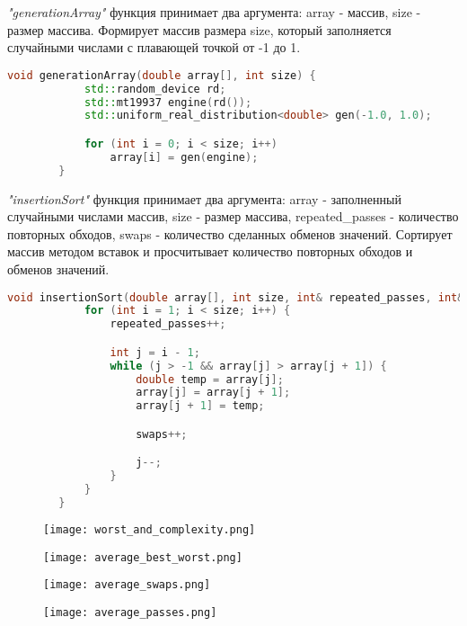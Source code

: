 \documentclass[12pt, a4paper]{report}
\begin{document}
	\textit{"generationArray"} функция принимает два аргумента: array - массив, size - размер массива. Формирует массив размера size, который заполняется случайными числами с плавающей точкой от -1 до 1.
	\lstset{style=mystyle}
	\begin{lstlisting}[language=C++]
		void generationArray(double array[], int size) {
			std::random_device rd;
			std::mt19937 engine(rd());
			std::uniform_real_distribution<double> gen(-1.0, 1.0);

			for (int i = 0; i < size; i++)
				array[i] = gen(engine);
		}		
	\end{lstlisting}

	\textit{"insertionSort"} функция принимает два аргумента: array - заполненный случайными числами массив, size - размер массива, repeated\_passes - количество повторных обходов, swaps - количество сделанных обменов значений. Сортирует массив методом вставок и просчитывает количество повторных обходов и обменов значений.
	\lstset{style=mystyle}
	\begin{lstlisting}[language=C++]
		void insertionSort(double array[], int size, int& repeated_passes, int& swaps) {
			for (int i = 1; i < size; i++) {
				repeated_passes++;

				int j = i - 1;
				while (j > -1 && array[j] > array[j + 1]) {
					double temp = array[j];
					array[j] = array[j + 1];
					array[j + 1] = temp;

					swaps++;

					j--;
				}
			}
		}
	\end{lstlisting}

	\newpage
	\vfill

	\begin{figure}
		\texttt{[image: worst\_and\_complexity.png]}
	\end{figure}
	\begin{figure}
		\texttt{[image: average\_best\_worst.png]}
	\end{figure}
	\begin{figure}
		\texttt{[image: average\_swaps.png]}
	\end{figure}
	\begin{figure}
		\texttt{[image: average\_passes.png]}
	\end{figure}

	\vfill
	\clearpage
\end{document}
